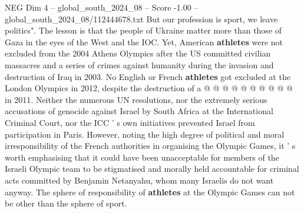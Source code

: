 \begin{textsample}{NEG Dim 4 – global\_south\_2024\_08 – Score -1.00 – global\_south\_2024\_08/112444678.txt}
But our profession is sport, we leave politics".
The lesson is that the people of Ukraine matter more than those of Gaza in the eyes of the West and the IOC.
Yet, American \textbf{athletes} were not excluded from the 2004 Athens Olympics after the US committed civilian massacres and a series of crimes against humanity during the invasion and destruction of Iraq in 2003.
No English or French \textbf{athletes} got excluded at the London Olympics in 2012, despite the destruction of a @ @ @ @ @ @ @ @ @ @ in 2011.
Neither the numerous UN resolutions, nor the extremely serious accusations of genocide against Israel by South Africa at the International Criminal Court, nor the ICC ' s own initiatives prevented Israel from participation in Paris.
However, noting the high degree of political and moral irresponsibility of the French authorities in organising the Olympic Games, it ' s worth emphasising that it could have been unacceptable for members of the Israeli Olympic team to be stigmatised and morally held accountable for criminal acts committed by Benjamin Netanyahu, whom many Israelis do not want anyway.
The sphere of responsibility of \textbf{athletes} at the Olympic Games can not be other than the sphere of sport.

\end{textsample}
